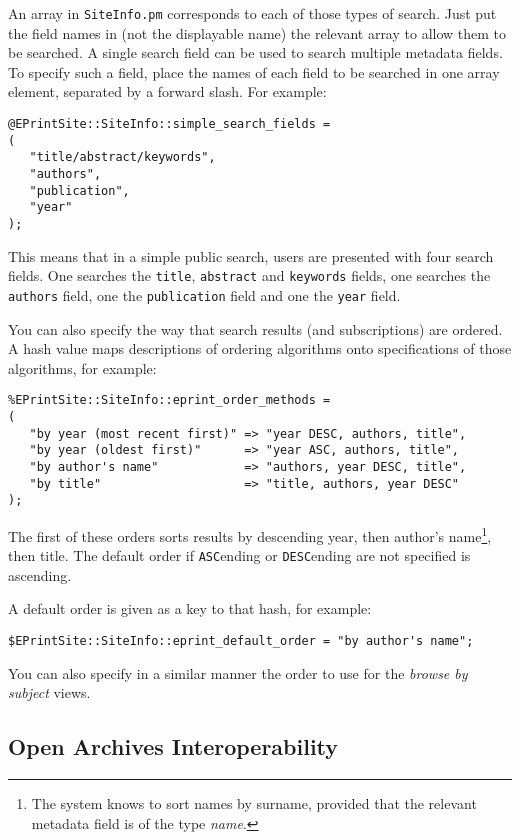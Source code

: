 An array in {\tt SiteInfo.pm} corresponds to each of those types of search. Just put the field names in (not the displayable name) the relevant array to allow them to be searched. A single search field can be used to search multiple metadata fields. To specify such a field, place the names of each field to be searched in one array element, separated by a forward slash. For example:

\begin{verbatim}
@EPrintSite::SiteInfo::simple_search_fields =
(
   "title/abstract/keywords",
   "authors",
   "publication",
   "year"
);
\end{verbatim}

This means that in a simple public search, users are presented with four search fields. One searches the {\tt title}, {\tt abstract} and {\tt keywords} fields, one searches the {\tt authors} field, one the {\tt publication} field and one the {\tt year} field.

You can also specify the way that search results (and subscriptions) are ordered. A hash value maps descriptions of ordering algorithms onto specifications of those algorithms, for example:

\begin{verbatim}
%EPrintSite::SiteInfo::eprint_order_methods =
(
   "by year (most recent first)" => "year DESC, authors, title",
   "by year (oldest first)"      => "year ASC, authors, title",
   "by author's name"            => "authors, year DESC, title",
   "by title"                    => "title, authors, year DESC"
);
\end{verbatim}

The first of these orders sorts results by descending year, then author's name\footnote{The system knows to sort names by surname, provided that the relevant metadata field is of the type \emph{name}.}, then title. The default order if {\tt ASC}ending or {\tt DESC}ending are not specified is ascending.

A default order is given as a key to that hash, for example:

\begin{verbatim}
$EPrintSite::SiteInfo::eprint_default_order = "by author's name";
\end{verbatim}

You can also specify in a similar manner the order to use for the \emph{browse by subject} views.


\subsection{Open Archives Interoperability}

